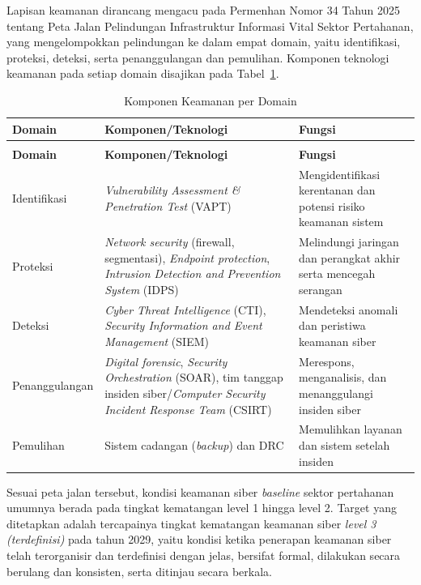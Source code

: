 Lapisan keamanan dirancang mengacu pada Permenhan Nomor 34 Tahun 2025 tentang Peta Jalan Pelindungan Infrastruktur Informasi Vital Sektor Pertahanan, yang mengelompokkan pelindungan ke dalam empat domain, yaitu identifikasi, proteksi, deteksi, serta penanggulangan dan pemulihan. Komponen teknologi keamanan pada setiap domain disajikan pada Tabel~\ref{tab:d4-24}.

\begin{longtable}{@{}>{\raggedright\arraybackslash}p{}>{\raggedright\arraybackslash}p{}>{\raggedright\arraybackslash}p{}@{}}
\caption{Komponen Keamanan per Domain}
\label{tab:d4-24}\\
\toprule
\textbf{Domain} & \textbf{Komponen/Teknologi} & \textbf{Fungsi}\\
\midrule
\endfirsthead
\multicolumn{3}{@{}l}{\small\itshape \tablename\ \thetable{} (lanjutan)}\\
\toprule
\textbf{Domain} & \textbf{Komponen/Teknologi} & \textbf{Fungsi}\\
\midrule
\endhead
\bottomrule
\endlastfoot
Identifikasi & \textit{Vulnerability Assessment \& Penetration Test} (VAPT) & Mengidentifikasi kerentanan dan potensi risiko keamanan sistem\\
Proteksi & \textit{Network security} (firewall, segmentasi), \textit{Endpoint protection}, \textit{Intrusion Detection and Prevention System} (IDPS) & Melindungi jaringan dan perangkat akhir serta mencegah serangan\\
Deteksi & \textit{Cyber Threat Intelligence} (CTI), \textit{Security Information and Event Management} (SIEM) & Mendeteksi anomali dan peristiwa keamanan siber\\
Penanggulangan & \textit{Digital forensic}, \textit{Security Orchestration} (SOAR), tim tanggap insiden siber/\textit{Computer Security Incident Response Team} (CSIRT) & Merespons, menganalisis, dan menanggulangi insiden siber\\
Pemulihan & Sistem cadangan (\textit{backup}) dan DRC & Memulihkan layanan dan sistem setelah insiden\\
\end{longtable}

Sesuai peta jalan tersebut, kondisi keamanan siber \textit{baseline} sektor pertahanan umumnya berada pada tingkat kematangan level 1 hingga level 2. Target yang ditetapkan adalah tercapainya tingkat kematangan keamanan siber \textit{level 3 (terdefinisi)} pada tahun 2029, yaitu kondisi ketika penerapan keamanan siber telah terorganisir dan terdefinisi dengan jelas, bersifat formal, dilakukan secara berulang dan konsisten, serta ditinjau secara berkala.

